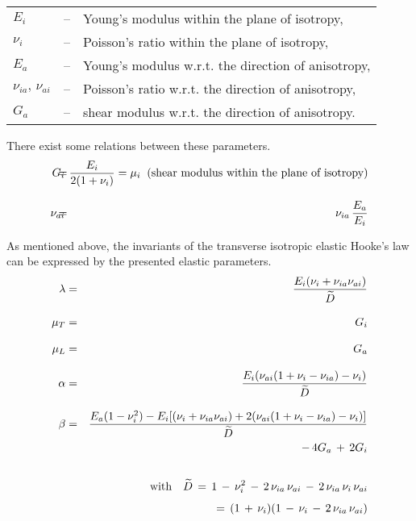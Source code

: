\begin{center}
\begin{tabular}{p{}p{}p{}}
$E_i$      & -- & Young's modulus within the plane of isotropy, \\[0.5ex]
$\nu_i$    & -- & Poisson's ratio within the plane of isotropy, \\[1.5ex]
$E_a$      & -- & Young's modulus w.r.t. the direction of anisotropy, \\[0.5ex]
$\nu_{ia},\,\nu_{ai}$ & -- & Poisson's ratio w.r.t. the direction of anisotropy, \\[0.5ex]
$G_a$      & -- & shear modulus w.r.t. the direction of anisotropy.
\end{tabular}
\end{center}

There exist some relations between these parameters.
\begin{eqnarray}
G_i      & \!\!\!\!\!= & 
\!\!\!\!\!\ttfrac{E_i}{2(1+\nu_i)}=\mu_i\;\;\mbox{(shear modulus within the plane of isotropy)} \\[2.0ex]
\nu_{ai} & \!\!\!\!\!= & \!\!\!\!\!\nu_{ia}\,\ttfrac{E_a}{E_i}
\end{eqnarray}

As mentioned above, the invariants of the transverse isotropic elastic Hooke's law can be expressed by the presented elastic parameters.
\begin{eqnarray*}
\lambda & = &  \frac{\textstyle{\textstyle{E_i(\nu_i+\nu_{ia}\nu_{ai})}}}{\textstyle{\textstyle{{\widetilde D}}}} \\[2.0ex]
\mu_T   & = &  G_i \\[2.0ex]
\mu_L   & = &  G_a \\[2.0ex]
\alpha  & = &  \frac{\textstyle{\textstyle{E_i(\nu_{ai}(1+\nu_i-\nu_{ia})-\nu_i)}}}{\textstyle{\textstyle{{\widetilde D}}}} \\[2.0ex]
\beta   & = &  \frac{\textstyle{\textstyle{E_a(1-\nu_i^2)-E_i[(\nu_i+\nu_{ia}\nu_{ai})+2(\nu_{ai}(1+\nu_i-\nu_{ia})-\nu_i)]}}}{\textstyle{\textstyle{{\widetilde D}}}} \\
        &   & \,-\,4G_a\,+\,2G_i \\[4.0ex]
        &   &  \mbox{with}\quad {\widetilde D}\,=\,
               1\,-\,\nu_i^2\,-\,2\,\nu_{ia}\,\nu_{ai}\,-\,2\,\nu_{ia}\,\nu_{i}\,\nu_{ai} \nonumber \\[1.0ex]
        &   &  \mbox{\hspace*{9.0ex}} =\,
               (1\,+\,\nu_i)(1\,-\,\nu_i\,-\,2\,\nu_{ia}\,\nu_{ai})
\end{eqnarray*}

